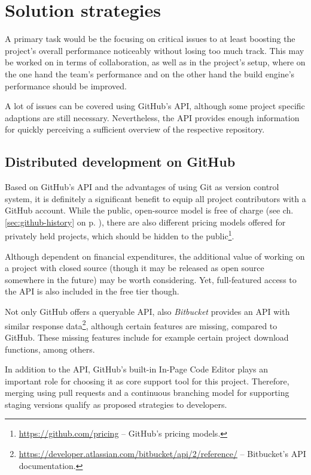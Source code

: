 \section{Solution strategies}
\label{sec:solution-strategies}

A primary task would be the focusing on critical issues to at least boosting the project's overall performance noticeably without losing too much track. This may be worked on in terms of collaboration, as well as in the project's setup, where on the one hand the team's performance and on the other hand the build engine's performance should be improved.

A lot of issues can be covered using GitHub's API, although some project specific adaptions are still necessary. Nevertheless, the API provides enough information for quickly perceiving a sufficient overview of the respective repository.


\subsection{Distributed development on GitHub}
\label{sec:solutions-distributeddevelopment}

Based on GitHub's API and the advantages of using Git as version control system, it is definitely a significant benefit to equip all project contributors with a GitHub account. While the public, open-source model is free of charge (see ch. \ref{sec:github-history} on p. \pageref{sec:github-history}), there are also different pricing models offered for privately held projects, which should be hidden to the public\footnote{\url{https://github.com/pricing} -- GitHub's pricing models.}.

Although dependent on financial expenditures, the additional value of working on a project with closed source (though it may be released as open source somewhere in the future) may be worth considering. Yet, full-featured access to the API is also included in the free tier though.

Not only GitHub offers a queryable API, also \emph{Bitbucket} provides an API with similar response data\footnote{\url{https://developer.atlassian.com/bitbucket/api/2/reference/} -- Bitbucket's API documentation.}, although certain features are missing, compared to GitHub. These missing features include for example certain project download functions, among others.

In addition to the API, GitHub's built-in In-Page Code Editor plays an important role for choosing it as core support tool for this project. Therefore, merging using pull requests and a continuous branching model for supporting staging versions qualify as proposed strategies to developers.


